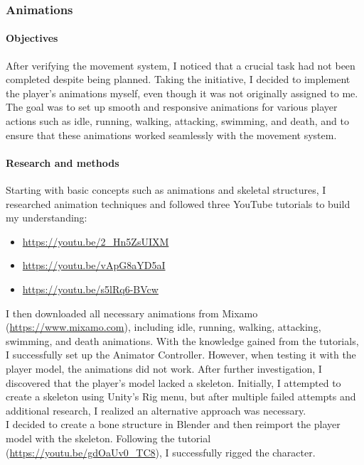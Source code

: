 \documentclass{article}
\begin{document}
\subsubsection{Animations}
\paragraph{Objectives}\hfill

After verifying the movement system, I noticed that a crucial task had not been completed despite being planned. Taking the initiative, I decided to implement the player's animations myself, even though it was not originally assigned to me. The goal was to set up smooth and responsive animations for various player actions such as idle, running, walking, attacking, swimming, and death, and to ensure that these animations worked seamlessly with the movement system.

\paragraph{Research and methods}\hfill

Starting with basic concepts such as animations and skeletal structures, I researched animation techniques and followed three YouTube tutorials to build my understanding:
\begin{itemize}
    \item \url{https://youtu.be/2_Hn5ZsUIXM}
    \item \url{https://youtu.be/vApG8aYD5aI}
    \item \url{https://youtu.be/s5lRq6-BVcw}
\end{itemize}
I then downloaded all necessary animations from Mixamo (\url{https://www.mixamo.com}), including idle, running, walking, attacking, swimming, and death animations. With the knowledge gained from the tutorials, I successfully set up the Animator Controller. However, when testing it with the player model, the animations did not work. After further investigation, I discovered that the player's model lacked a skeleton. Initially, I attempted to create a skeleton using Unity's Rig menu, but after multiple failed attempts and additional research, I realized an alternative approach was necessary.\\

I decided to create a bone structure in Blender and then reimport the player model with the skeleton. Following the tutorial (\url{https://youtu.be/gdOaUv0_TC8}), I successfully rigged the character.
\end{document}
